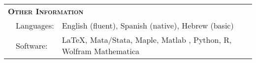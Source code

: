 \begin{tabular}{lll}
	
	\multicolumn{3}{l}{
		\large
		\textbf{%
			\textsc{%
				Other Information
			}
		}
	}
	\\[2ex]
	
	  \indent
	& Languages:
	& English (fluent), Spanish (native), Hebrew (basic)
	\\[.5ex]
	
	& Software:
	& \LaTeX, Mata/Stata, Maple, Matlab , Python, R, Wolfram Mathematica
	\\[.5ex]
		
\end{tabular}

